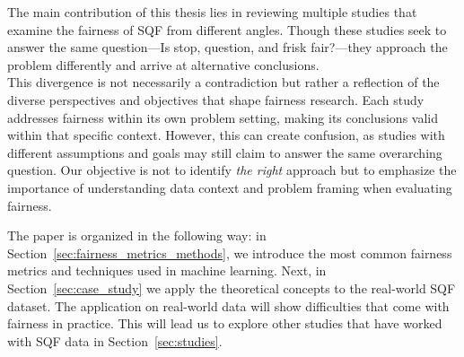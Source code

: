 The main contribution of this thesis lies in reviewing multiple studies that examine the fairness of SQF from different angles. Though these studies seek to answer the same question—Is stop, question, and frisk fair?—they approach the problem differently and arrive at alternative conclusions.\\
This divergence is not necessarily a contradiction but rather a reflection of the diverse perspectives and objectives that shape fairness research. Each study addresses fairness within its own problem setting, making its conclusions valid within that specific context. However, this can create confusion, as studies with different assumptions and goals may still claim to answer the same overarching question. Our objective is not to identify \textit{the right} approach but to emphasize the importance of understanding data context and problem framing when evaluating fairness.\par
The paper is organized in the following way: in Section~\ref{sec:fairness_metrics_methods}, we introduce the most common fairness metrics and techniques used in machine learning.
Next, in Section~\ref{sec:case_study} we apply the theoretical concepts to the real-world SQF dataset. 
The application on real-world data will show difficulties that come with fairness in practice.
This will lead us to explore other studies that have worked with SQF data in Section~\ref{sec:studies}. 


